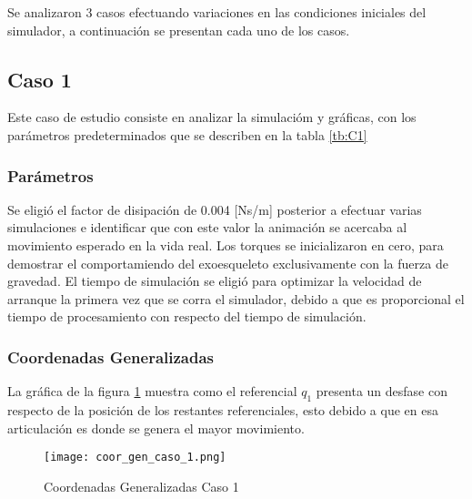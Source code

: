 Se analizaron 3 casos efectuando variaciones en las condiciones iniciales del simulador, a continuación se presentan cada uno de los casos.

\subsection{Caso 1}\label{caso1}
    Este caso de estudio consiste en analizar la simulacióm y gráficas, con los parámetros  predeterminados que se describen en la tabla \ref{tb:C1}
    \subsubsection{Parámetros}

    Se eligió el factor de disipación de 0.004 [Ns/m] posterior a efectuar varias simulaciones e identificar que con este valor la animación se acercaba al movimiento esperado en la vida real.
    Los torques se inicializaron en cero, para demostrar el comportamiendo del exoesqueleto exclusivamente con la fuerza de gravedad.
    El tiempo de simulación se eligió para optimizar la velocidad de arranque la primera vez que se corra el simulador, debido a que es proporcional el tiempo de procesamiento con respecto del tiempo de simulación.
    \begin{table}[H]%
        \centering
        \begin{center}
        \caption{Parámetros originales del simulador (Sistema No Conservativo)} 
        \centering
        \bigskip
        \end{center}
    \label{tb:C1}
    \end{table}

    \subsubsection{Coordenadas Generalizadas}
    La gráfica de la figura \ref{fig:CoordGenC1} muestra como el referencial $q_1$ presenta un desfase con respecto de la posición de los restantes referenciales, esto debido a que en esa articulación es donde se genera el mayor movimiento. 
    \begin{figure} [H]%
            \centering
            \texttt{[image: coor\_gen\_caso\_1.png]} 
        \caption{Coordenadas Generalizadas Caso 1}
        \label{fig:CoordGenC1}
    \end{figure}

